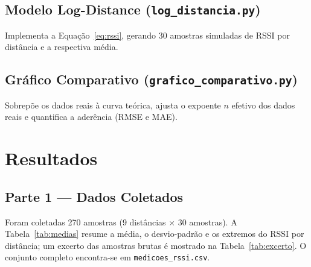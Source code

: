 \documentclass[
  12pt,
  a4paper,
  oneside,
  brazil,
  chapter=TITLE,
  section=TITLE,
]{abntex2}
\begin{document}
\section{Modelo Log-Distance (\texttt{log\_distancia.py})}

Implementa a Equa\c{c}\~ao~\ref{eq:rssi}, gerando 30 amostras simuladas de RSSI
por dist\^ancia e a respectiva m\'edia.



\section{Gr\'afico Comparativo (\texttt{grafico\_comparativo.py})}

Sobrep\~oe os dados reais \`a curva te\'orica, ajusta o expoente $n$ efetivo dos
dados reais e quantifica a ader\^encia (RMSE e MAE).



\chapter{Resultados}

\section{Parte 1 --- Dados Coletados}

Foram coletadas 270 amostras (9 dist\^ancias $\times$ 30 amostras). A
Tabela~\ref{tab:medias} resume a m\'edia, o desvio-padr\~ao e os extremos do
RSSI por dist\^ancia; um excerto das amostras brutas \'e mostrado na
Tabela~\ref{tab:excerto}. O conjunto completo encontra-se em
\texttt{medicoes\_rssi.csv}.
\end{document}
